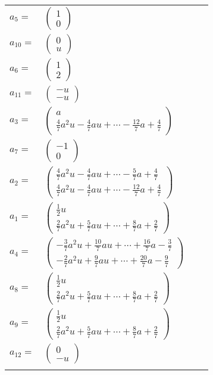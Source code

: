 \documentclass[1p]{elsarticle_modified}
\theoremstyle{definition}
\begin{document}
\begin{tabular}{m{7pt} m{180pt} m{7pt} m{180pt} }
\flushright $a_{5}=$&$\begin{pmatrix}1\\0\end{pmatrix}$ \\
\flushright $a_{10}=$&$\begin{pmatrix}0\\u\end{pmatrix}$ \\
\flushright $a_{6}=$&$\begin{pmatrix}1\\2\end{pmatrix}$ \\
\flushright $a_{11}=$&$\begin{pmatrix}- u\\- u\end{pmatrix}$ \\
\flushright $a_{3}=$&$\begin{pmatrix}a\\\frac{4}{7} a^2 u-\frac{4}{7} a u+\cdots-\frac{12}{7} a+\frac{4}{7}\end{pmatrix}$ \\
\flushright $a_{7}=$&$\begin{pmatrix}-1\\0\end{pmatrix}$ \\
\flushright $a_{2}=$&$\begin{pmatrix}\frac{4}{7} a^2 u-\frac{4}{7} a u+\cdots-\frac{5}{7} a+\frac{4}{7}\\\frac{4}{7} a^2 u-\frac{4}{7} a u+\cdots-\frac{12}{7} a+\frac{4}{7}\end{pmatrix}$ \\
\flushright $a_{1}=$&$\begin{pmatrix}\frac{1}{2} u\\\frac{2}{7} a^2 u+\frac{5}{7} a u+\cdots+\frac{8}{7} a+\frac{2}{7}\end{pmatrix}$ \\
\flushright $a_{4}=$&$\begin{pmatrix}-\frac{3}{7} a^2 u+\frac{10}{7} a u+\cdots+\frac{16}{7} a-\frac{3}{7}\\-\frac{2}{7} a^2 u+\frac{9}{7} a u+\cdots+\frac{20}{7} a-\frac{9}{7}\end{pmatrix}$ \\
\flushright $a_{8}=$&$\begin{pmatrix}\frac{1}{2} u\\\frac{2}{7} a^2 u+\frac{5}{7} a u+\cdots+\frac{8}{7} a+\frac{2}{7}\end{pmatrix}$ \\
\flushright $a_{9}=$&$\begin{pmatrix}\frac{1}{2} u\\\frac{2}{7} a^2 u+\frac{5}{7} a u+\cdots+\frac{8}{7} a+\frac{2}{7}\end{pmatrix}$ \\
\flushright $a_{12}=$&$\begin{pmatrix}0\\- u\end{pmatrix}$\\&\end{tabular}
\end{document}
